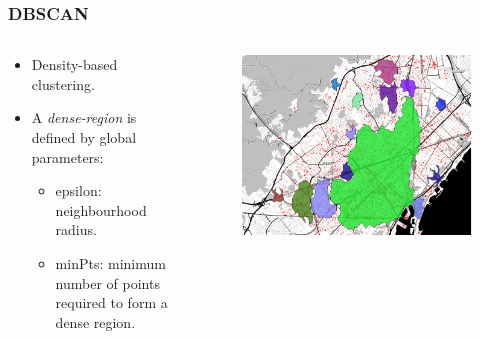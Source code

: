 \documentclass[hyperref={pdfpagelabels=true}]{beamer}
\begin{document}
\begin{frame}
\frametitle{DBSCAN}
\begin{columns}
  \begin{column}{0.5\textwidth}\small{ 
    \begin{itemize}    
	  \item<1->Density-based clustering.%
	  \item<1->A \textit{dense-region} is defined by global parameters: 
	  \begin{itemize}
	    \item<1->epsilon: neighbourhood radius.
	    \item<1->minPts: minimum number of points required to form a dense region.
	  \end{itemize}                
    \end{itemize}              }  
  \end{column}
  \begin{column}{0.5\textwidth}    
      \begin{figure}   
	\includegraphics[width=\textwidth]{elki_dbscan_003_250.png}   
      \end{figure}     
  \end{column}  
\end{columns}
\end{frame}
\end{document}
